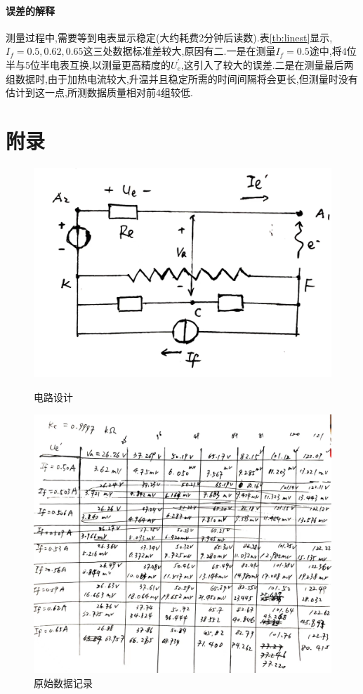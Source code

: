 \documentclass[UTF8,a4paper]{article}%
\begin{document}
\paragraph{误差的解释}
测量过程中,需要等到电表显示稳定(大约耗费2分钟后读数).表\ref{tb:linest}显示,$I_f=0.5,0.62,0.65$这三处数据标准差较大,原因有二.一是在测量$I_f=0.5$途中,将4位半与5位半电表互换,以测量更高精度的$U_e^\prime$,这引入了较大的误差.二是在测量最后两组数据时,由于加热电流较大,升温并且稳定所需的时间间隔将会更长,但测量时没有估计到这一点,所测数据质量相对前4组较低.
\appendix
\section{附录}
\begin{figure}[H]
    \centering
    \begin{minipage}[t]{0.35\linewidth}
        \centering
        \includegraphics[width=0.9\linewidth]{circuit-design.png}
        \caption{电路设计}
        \label{fg:circuit}
    \end{minipage}
    \begin{minipage}[t]{0.55\linewidth}
        \centering
        \includegraphics[width=0.9\linewidth]{data.png}
        \caption{原始数据记录}
        \label{fg:data}
    \end{minipage}
\end{figure}
\end{document}
